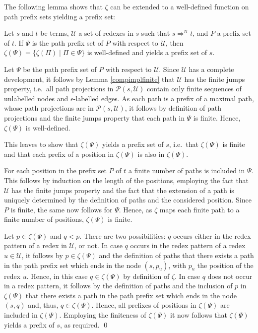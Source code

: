 \documentclass{LMCS}
\theoremstyle{definition}
\newcommand{\seper}{\; | \;}
\newcommand{\redpos}[1]{p_{#1}}
\newcommand{\apath}{\Pi}
\newcommand{\dev}{\Rightarrow}
\begin{document}
The following lemma shows that $\zeta$ can be extended to a well-defined function on path prefix sets yielding a prefix set:

\begin{lem}
\label{lem:zetaprefix}
Let $s$ and $t$ be terms, $\mathcal{U}$ a set of redexes in $s$ such that $s \dev^\mathcal{U} t$, and $P$ a prefix set of $t$. If $\Psi$ is the path prefix set of $P$ with respect to $\mathcal{U}$, then $\zeta(\Psi) = \{ \zeta(\apath) \seper \apath \in \Psi\}$ is well-defined and yields a prefix set of $s$.
\end{lem}

\proof
Let $\Psi$ be the path prefix set of $P$ with respect to $\mathcal{U}$. Since $\mathcal{U}$ has a complete development, it follows by Lemma \ref{compimplfinite} that $\mathcal{U}$ has the finite jumps property, i.e.\ all path projections in $\mathcal{P}(s, \mathcal{U})$ contain only finite sequences of unlabelled nodes and $\epsilon$-labelled edges. As each path is a prefix of a maximal path, whose path projections are in $\mathcal{P}(s, \mathcal{U})$, it follows by definition of path projections and the finite jumps property that each path in $\Psi$ is finite. Hence, $\zeta(\Psi)$ is well-defined.

This leaves to show that $\zeta(\Psi)$ yields a prefix set of $s$, i.e.\ that $\zeta(\Psi)$ is finite and that each prefix of a position in $\zeta(\Psi)$ is also in $\zeta(\Psi)$.

For each position in the prefix set $P$ of $t$ a finite number of paths is included in $\Psi$. This follows by induction on the length of the positions, employing the fact that $\mathcal{U}$ has the finite jumps property and the fact that the extension of a path is uniquely determined by the definition of paths and the considered position. Since $P$ is finite, the same now follows for $\Psi$. Hence, as $\zeta$ maps each finite path to a finite number of positions, $\zeta(\Psi)$ is finite.

Let $p \in \zeta(\Psi)$ and $q < p$. There are two possibilities: $q$ occurs either in the redex pattern of a redex in $\mathcal{U}$, or not. In case $q$ occurs in the redex pattern of a redex $u \in \mathcal{U}$, it follows by $p \in \zeta(\Psi)$ and the definition of paths that there exists a path in the path prefix set which ends in the node $(s, \redpos{u})$, with $\redpos{u}$ the position of the redex $u$. Hence, in this case $q \in \zeta(\Psi)$ by definition of $\zeta$. In case $q$ does not occur in a redex pattern, it follows by the definition of paths and the inclusion of $p$ in $\zeta(\Psi)$ that there exists a path in the path prefix set which ends in the node $(s, q)$ and, thus, $q \in \zeta(\Psi)$. Hence, all prefixes of positions in $\zeta(\Psi)$ are included in $\zeta(\Psi)$. Employing the finiteness of $\zeta(\Psi)$ it now follows that $\zeta(\Psi)$ yields a prefix of $s$, as required.
\qed
\end{document}
